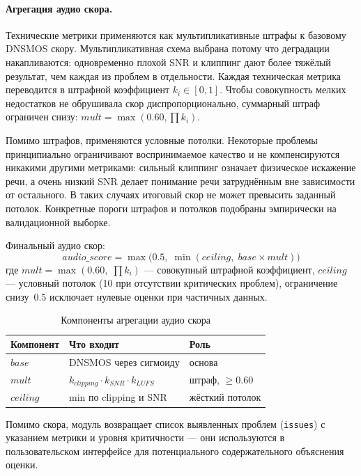 \paragraph{Агрегация аудио скора.}

Технические метрики применяются как мультипликативные штрафы к базовому
DNSMOS скору. Мультипликативная схема выбрана потому что деградации накапливаются:
одновременно плохой SNR и клиппинг дают более тяжёлый результат,
чем каждая из проблем в отдельности.
Каждая техническая метрика переводится в штрафной коэффициент $k_i\in[0,1]$.
Чтобы совокупность мелких недостатков не обрушивала скор диспропорционально,
суммарный штраф ограничен снизу: $\textit{mult} = \max(0.60, \prod k_i)$.

Помимо штрафов, применяются условные потолки.
Некоторые проблемы принципиально ограничивают воспринимаемое качество
и не компенсируются никакими другими метриками:
сильный клиппинг означает физическое искажение речи,
а очень низкий SNR делает понимание речи затруднённым вне зависимости от остального.
В таких случаях итоговый скор не может превысить заданный потолок.
Конкретные пороги штрафов и потолков подобраны эмпирически
на валидационной выборке.

Финальный аудио скор:
\begin{equation}
\textit{audio\_score} = \max\!\bigl(0.5,\;
    \min(\textit{ceiling},\;\textit{base} \times \textit{mult})\bigr)
\end{equation}
где $\textit{mult} = \max(0.60,\;\prod k_i)$ — совокупный штрафной коэффициент,
$\textit{ceiling}$ — условный потолок (10 при отсутствии критических проблем),
ограничение снизу~0.5 исключает нулевые оценки при частичных данных.

\begin{table}[h]
\centering
\small
\begin{tabular}{lll}
\toprule
\textbf{Компонент} & \textbf{Что входит} & \textbf{Роль} \\
\midrule
$\textit{base}$ & DNSMOS через сигмоиду & основа \\
$\textit{mult}$ & $k_{\textit{clipping}} \cdot k_{\textit{SNR}} \cdot k_{\textit{LUFS}}$ & штраф, $\geq 0.60$ \\
$\textit{ceiling}$ & min по clipping и SNR & жёсткий потолок \\
\bottomrule
\end{tabular}
\caption{Компоненты агрегации аудио скора}
\end{table}

Помимо скора, модуль возвращает список выявленных проблем (\texttt{issues}) с указанием метрики и уровня критичности
— они используются в пользовательском интерфейсе для потенциального содержательного объяснения оценки.

